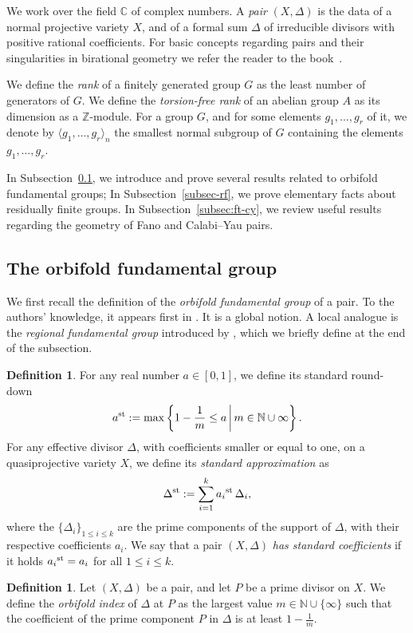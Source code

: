 \documentclass{amsart}
\newcommand{\zz}{\mathbb{Z}}
\newcommand{\cc}{\mathbb{C}}
\theoremstyle{definition}
\newtheorem{definition}[theorem]{Definition}
\theoremstyle{remark}
\numberwithin{equation}{section}
\begin{document}
We work over the field $\cc$ of complex numbers. A {\it pair} $(X,\Delta)$ is the data of a normal projective variety $X$, and of a formal sum $\Delta$ of irreducible divisors with positive rational coefficients. For basic concepts regarding pairs and their singularities in birational geometry
we refer the reader to the book~\cite{Kol13}. 

We define the {\it rank} of a finitely generated group $G$ as the least number of generators of $G$. We define the {\it torsion-free rank} of an abelian group $A$ as its dimension as a $\zz$-module. For a group $G$, and for some elements $g_1,\dots,g_r$ of it, 
we denote by $\langle g_1,\dots,g_r\rangle_n$ the smallest normal subgroup of $G$ containing the elements $g_1,\dots,g_r$.


In Subsection~\ref{subsec:orb-fun}, we introduce and prove several results related to orbifold fundamental groups; In Subsection~\ref{subsec-rf}, we prove elementary facts about residually finite groups. In Subsection~\ref{subsec:ft-cy}, we review useful results regarding the geometry of Fano and Calabi--Yau pairs. 

\subsection{The orbifold fundamental group}\label{subsec:orb-fun}
We first recall the definition of the {\it orbifold fundamental group} of a pair. To the authors' knowledge, it appears first in \cite[14.10.1]{DM93} \cite[Definition 4.4]{Cat00}. It is a global notion. A local analogue is the {\it regional fundamental group} introduced by \cite{Bra20}, which we briefly define at the end of the subsection.

\begin{definition}\label{def:reg-fund}
For any real number $a\in [0,1]$, we define its standard round-down
\[
a^{\rm st}:=\max\left\{1-\frac{1}{m}\leq a\, \biggr\rvert\, m\in \mathbb{N}\cup \infty\right\}.
\]
For any effective divisor $\Delta$, with coefficients smaller or equal to one, on a quasiprojective variety $X$, we define its {\em standard approximation} as $$\Delta^{\rm st}:=\sum_{i=1}^k {a_i}^{\rm st}\, \Delta_i,$$
where the $\{\Delta_i\}_{1\le i\le k}$ are the prime components of the support of $\Delta$, with their respective coefficients $a_i$.
We say that a pair $(X,\Delta)$ {\em has standard coefficients} if it holds ${a_i}^{\rm st}=a_i$ for all $1\le i\le k$.
\end{definition}

\begin{definition}
    Let $(X,\Delta)$ be a pair, and let $P$ be a prime divisor on $X$. We define the {\it orbifold index} of $\Delta$ at $P$ as the largest value $m\in\mathbb{N}\cup\{\infty\}$ such that the coefficient of the prime component $P$ in $\Delta$ is at least $1 -\frac{1}{m}$.
\end{definition}
\end{document}

